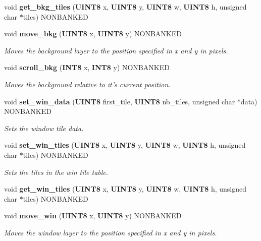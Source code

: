 \begin{CompactItemize}
\item 
\label{gb.h_a80}
void {\bf get\_\-bkg\_\-tiles} ({\bf UINT8} x, {\bf UINT8} y, {\bf UINT8} w, {\bf UINT8} h, unsigned char $\ast$tiles) NONBANKED
\item 
void {\bf move\_\-bkg} ({\bf UINT8} x, {\bf UINT8} y) NONBANKED
\begin{CompactList}\small\item\em Moves the background layer to the position specified in x and y in pixels.\item\end{CompactList}

\item 
void {\bf scroll\_\-bkg} ({\bf INT8} x, {\bf INT8} y) NONBANKED
\begin{CompactList}\small\item\em Moves the background relative to it's current position.\item\end{CompactList}

\item 
void {\bf set\_\-win\_\-data} ({\bf UINT8} first\_\-tile, {\bf UINT8} nb\_\-tiles, unsigned char $\ast$data) NONBANKED
\begin{CompactList}\small\item\em Sets the window tile data.\item\end{CompactList}

\item 
void {\bf set\_\-win\_\-tiles} ({\bf UINT8} x, {\bf UINT8} y, {\bf UINT8} w, {\bf UINT8} h, unsigned char $\ast$tiles) NONBANKED
\begin{CompactList}\small\item\em Sets the tiles in the win tile table.\item\end{CompactList}

\item 
\label{gb.h_a85}
void {\bf get\_\-win\_\-tiles} ({\bf UINT8} x, {\bf UINT8} y, {\bf UINT8} w, {\bf UINT8} h, unsigned char $\ast$tiles) NONBANKED
\item 
void {\bf move\_\-win} ({\bf UINT8} x, {\bf UINT8} y) NONBANKED
\begin{CompactList}\small\item\em Moves the window layer to the position specified in x and y in pixels.\item\end{CompactList}


\end{CompactItemize}
